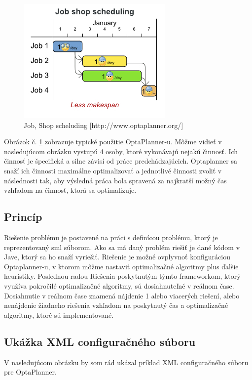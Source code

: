 \begin{figure}[htb]

\begin{center}

\includegraphics[scale=0.5]{fig/useCaseOverview.jpg} 
\caption{Job, Shop scheluding  [http://www.optaplanner.org/] }
\label{obrazokUseCase}

\end{center}

\end{figure}
Obrázok č. \ref{obrazokUseCase} zobrazuje typické použitie OptaPlanner-u. Môžme vidieť v nasledujúcom obrázku vystupú 4 osoby, ktoré vykonávajú nejakú činnosť. Ich činnosť je špecifická a silne závisí od práce predchádzajúcich. Optaplanner sa snaží ich činnosti maximálne optimalizovať a jednotlivé činnosti zvoliť v následnosti tak, aby výsledná práca bola spravená za najkratší možný čas vzhľadom na činnosť, ktorá sa optimalizuje.


\subsection{Princíp}
Riešenie problému je postavené na práci s definícou problému, ktorý je reprezentovaný sml súborom. Ako sa má daný problém riešiť je  dané kódom v Jave, ktorý sa ho snaží vyriešiť. Riešenie je možné ovplyvnoť konfiguráciou Optaplanner-u, v ktorom môžme nastaviť optimalizačné algoritmy plus ďalšie heuristiky. Poslednou radou 
Riešenia poskytnutým týmto frameworkom, ktorý využíva pokročilé optimalizačné algoritmy, sú dosiahnuteľné v reálnom čase. Dosiahnutie v reálnom čase znamená nájdenie 1 alebo viacerých riešení, alebo nenájdenie žiadneho riešenia vzhľadom na poskytnutý čas a optimalizačné algoritmy, ktoré sú implementované.




\subsection{Ukážka XML configuračného súboru}
V nasledujúcom obrázku by som rád ukázal príklad XML configuračného súboru pre OptaPlanner.
    

